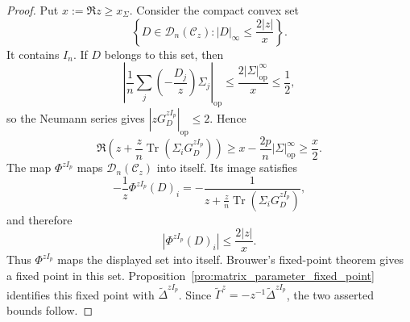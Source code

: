 \documentclass[EJP, preprint, NODS, nobera, nofontexpansion]{ejpecp}
\DeclareMathOperator{\op}{op}
\DeclareMathOperator{\tr}{Tr}
\begin{document}
\begin{proof}
Put \(x:=\Re z\geq x_\Sigma\).  Consider the compact convex set
\[
    \left\{
        D\in\mathcal D_n(\mathcal C_z):
        |D|_\infty\leq\frac{2|z|}{x}
    \right\}.
\]
It contains $I_n$.  If \(D\) belongs to this set, then
\[
    \left|
        \frac1n\sum_j\left(-\frac{D_j}{z}\right)\Sigma_j
    \right|_{\op}
    \leq\frac{2|\Sigma|_{\op}^\infty}x\leq\frac12,
\]
so the Neumann series gives \(|zG_D^{zI_p}|_{\op}\leq2\).  Hence
\[
    \Re\left(
        z+\frac zn\tr(\Sigma_iG_D^{zI_p})
    \right)
    \geq x-\frac{2p}{n}|\Sigma|_{\op}^\infty
    \geq\frac x2.
\]
The map \(\Phi^{zI_p}\) maps \(\mathcal D_n(\mathcal C_z)\) into itself.  Its image satisfies
\[
    -\frac1z\Phi^{zI_p}(D)_i
    =-\frac1{
        z+\frac zn\tr(\Sigma_iG_D^{zI_p})
      },
\]
and therefore
\[
    |\Phi^{zI_p}(D)_i|
    \leq\frac{2|z|}{x}.
\]
Thus $\Phi^{zI_p}$ maps the displayed set into itself.  Brouwer's fixed-point theorem gives a fixed point in this set. Proposition~\ref{pro:matrix_parameter_fixed_point}
identifies this fixed point with
$\widetilde\Delta^{zI_p}$.  Since
$\tilde\Gamma^z=-z^{-1}\widetilde\Delta^{zI_p}$, the two asserted bounds
follow.
\end{proof}
\end{document}
